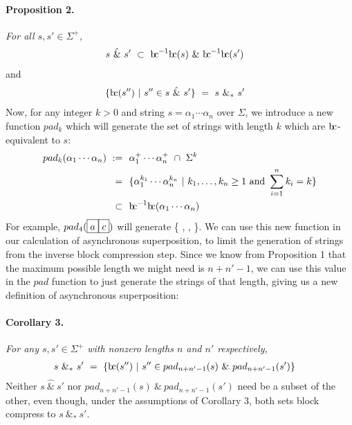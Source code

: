 \documentclass[a4paper,11pt,leqno]{article}
\newcommand{\bc}{{\rm b\!c}}
\newcommand{\vph}[1]{\vphantom{#1}}
\newcommand{\eboxl}[1]{\fbox{$\vph{'}#1$}}
\begin{document}
\paragraph{Proposition 2.} {\sl For all $s,s'\in \Sigma^+$,}
\begin{align}
s\ \hat{\&}\ s' & \ \subset\ \bc^{-1}\bc(s)\ \&\ \bc^{-1}\bc(s')
\end{align}
and
\begin{align}
\{\bc(s'')\ | \ s''\in s\ \hat{\&}\ s'\}
& \ = \   s\ \&_*\ s'
\end{align}
Now, for any integer $k > 0$ and string $s = \alpha_1\cdots\alpha_n$ over 
$\Sigma$, we introduce a new 
function 
$pad_k$ which will generate the set of strings with length $k$ which are 
$\bc$-equivalent to $s$:
\begin{align}
pad_k(\alpha_1\cdots\alpha_n)~:=&~~\alpha_1^+\cdots\alpha_n^+\ \cap\ \Sigma^k \\
=&~~\{
\alpha_1^{k_1}\cdots\alpha_n^{k_n}\ | \
k_1,\ldots,k_n\geq 1
\mbox{ and } \sum_{i=1}^n k_i = k \}\\
\subset&~~\bc^{-1}\bc(\alpha_1\cdots\alpha_n)
\end{align}
For example, $pad_{4}(\eboxl{a}\eboxl{c})$ will 
generate \{
\eboxl{a}\eboxl{a}\eboxl{a}\eboxl{c}, 
\eboxl{a}\eboxl{a}\eboxl{c}\eboxl{c}, 
\eboxl{a}\eboxl{c}\eboxl{c}\eboxl{c} \}. We 
can use this new function in our 
calculation of asynchronous superposition, to limit the generation of strings 
from the inverse block compression step. Since we know from Proposition 1 that 
the maximum possible 
length we might need is $n+n'-1$, we can use this value in the $pad$ function 
to just 
generate the strings of that length, giving us a new definition of asynchronous 
superposition:
\paragraph{Corollary 3.} {\sl For any $s,s'\in \Sigma^+$
	with nonzero lengths $n$ and $n'$ respectively,}
\begin{align}
s \ \&_* \ s' & \ = \
\{\bc(s'')\ | \ s''\in pad_{n+n'-1}(s)\ \& \ pad_{n+n'-1}(s')\}
\end{align}
Neither $s\ \hat{\&}\ s'$ nor $pad_{n+n'-1}(s)\ \& \ pad_{n+n'-1}(s')$
need be a subset of the other, even though,
under the assumptions of Corollary 3, 
both sets block compress to $s \ \&_* \ s'$.
\end{document}
